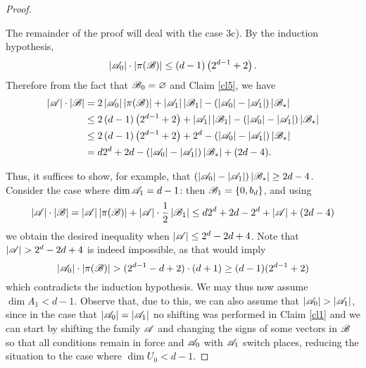 \begin{proof}
\begin{enumerate}
\begin{enumerate}
        \end{enumerate}
    \end{enumerate}
    The remainder of the proof will deal with the case 3c). By the induction hypothesis, \begin{equation*}
            \left|{\mathscr{A}}_0\right|\cdot\left|\pi({\mathscr{B}})\right|\leq\left(d-1\right)\left(2^{d-1}+2\right).
        \end{equation*}
        Therefore from the fact that ${\mathscr{B}}_0 = \varnothing$ and Claim \ref{cl5}, we have 
        \begin{align}
            \left|{\mathscr{A}}\right|\cdot\left|{\mathscr{B}}\right|&=2\left|{\mathscr{A}}_0\right|\left|\pi({\mathscr{B}})\right|+\left|{\mathscr{A}}_1\right|\left|{\mathscr{B}}_1\right|-\left(\left|{\mathscr{A}}_0\right|-\left|{\mathscr{A}}_1\right|\right)\left|{\mathscr{B}}_*\right| \label{general} \\
            & \leq 2\left(d-1\right)\left(2^{d-1}+2\right)+\left|{\mathscr{A}}_1\right|\left|{\mathscr{B}}_1\right|-\left(\left|{\mathscr{A}}_0\right|-\left|{\mathscr{A}}_1\right|\right)\left|{\mathscr{B}}_*\right| \label{general_ind} \\
            & \leq 2\left(d-1\right)\left(2^{d-1}+2\right)+2^{d}-\left(\left|{\mathscr{A}}_0\right|-\left|{\mathscr{A}}_1\right|\right)\left|{\mathscr{B}}_*\right| \nonumber \\
            & = d 2^{d} + 2d - \left(\left|{\mathscr{A}}_0\right|-\left|{\mathscr{A}}_1\right|\right)\left|{\mathscr{B}}_*\right| + (2d-4). \label{2d_minus_4}
        \end{align}
        
        \noindent Thus, it suffices to show, for example, that 
        $\left(\left|{\mathscr{A}}_0\right|-\left|{\mathscr{A}}_1\right|\right)\left|{\mathscr{B}}_*\right|\geq 2d-4$. \\
        \noindent Consider the case where $\operatorname{dim}{\mathscr{A}}_1=d-1$: then ${\mathscr{B}}_1=\{0,b_d\}$, and using 
        \begin{equation*}
            \left|{\mathscr{A}}\right|\cdot\left|{\mathscr{B}}\right|=\left|{\mathscr{A}}\right|\left|\pi({\mathscr{B}})\right|+\left|{\mathscr{A}}\right|\cdot\frac{1}{2}\left|{\mathscr{B}}_1\right|\leq d 2^d + 2d - 2^d + \left|{\mathscr{A}}\right|+(2d-4)
        \end{equation*}
        we obtain the desired inequality when $\left|{\mathscr{A}}\right|\leq 2^d-2d+4 $. Note that $\left|\aaa\right|> 2^d-2d+4$ is indeed impossible, as that would imply
        \begin{equation*}
            \left|{\mathscr{A}}_0\right|\cdot\left|\pi({\mathscr{B}})\right| > (2^{d-1}-d+2)\cdot(d+1)\geq(d-1)(2^{d-1}+2)
        \end{equation*}
        which contradicts the induction hypothesis. We may thus now assume $\operatorname{dim}A_1<d-1 $. Observe that, due to this, we can also assume that $\left|\aaa_0\right|>\left|\aaa_1\right|$, since in the case that $\left|{\mathscr{A}}_0\right|=\left|{\mathscr{A}}_1\right|$ no shifting was performed in Claim \ref{cl1} and we can start by shifting the family ${\mathscr{A}}$ and changing the signs of some vectors in ${\mathscr{B}}$ so that all conditions remain in force and ${\mathscr{A}}_0$ with ${\mathscr{A}}_1$ switch places, reducing the situation to the case where $\operatorname{dim}U_0<d-1$. 


\end{proof}
